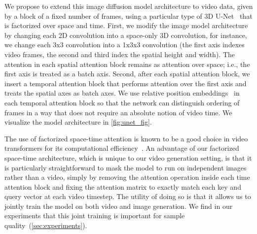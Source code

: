 We propose to extend this image diffusion model architecture to video data, given by a block of a fixed number of frames, using a particular type of 3D U-Net~\citep{cciccek20163d} that is factorized over space and time. First, we modify the image model architecture by changing each 2D convolution into a space-only 3D convolution, for instance, we change each 3x3 convolution into a 1x3x3 convolution (the first axis indexes video frames, the second and third index the spatial height and width). The attention in each spatial attention block remains as attention over space; i.e., the first axis is treated as a batch axis. Second, after each spatial attention block, we insert a temporal attention block that performs attention over the first axis and treats the spatial axes as batch axes. We use relative position embeddings~\citep{shaw2018self} in each temporal attention block so that the network can distinguish ordering of frames in a way that does not require an absolute notion of video time. We visualize the model architecture in \ref{fig:unet_fig}.

The use of factorized space-time attention is known to be a good choice in video transformers for its computational efficiency~\citep{arnab2021vivit,bertasius2021space,ho2019axial}. An advantage of our factorized space-time architecture, which is unique to our video generation setting, is that it is particularly straightforward to mask the model to run on independent images rather than a video, simply by removing the attention operation inside each time attention block and fixing the attention matrix to exactly match each key and query vector at each video timestep. The utility of doing so is that it allows us to jointly train the model on both video and image generation. We find in our experiments that this joint training is important for sample quality~(\ref{sec:experiments}).

